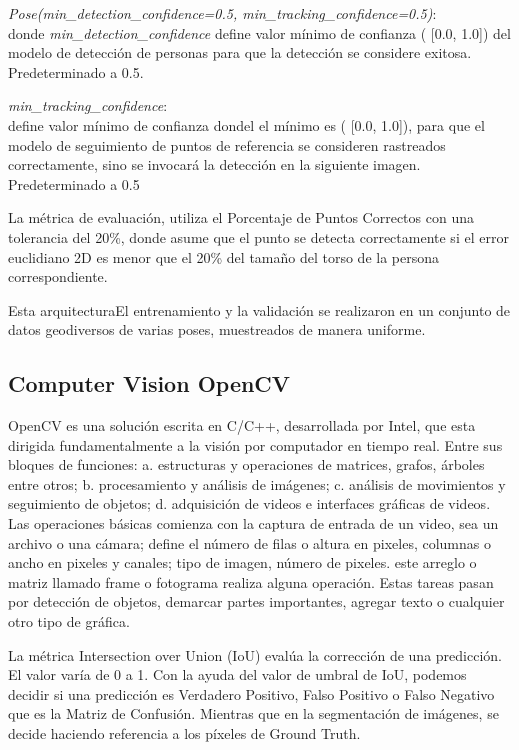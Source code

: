 \documentclass[twoside,11pt]{article}
\begin{document}
\textit{Pose(min\_detection\_confidence=0.5, min\_tracking\_confidence=0.5)}:\\
donde \textit{min\_detection\_confidence} define valor mínimo de 
confianza ( [0.0, 1.0]) del modelo de detección de personas para 
que la detección se considere exitosa. Predeterminado a 0.5. 

\textit{min\_tracking\_confidence}:\\ define valor mínimo de confianza 
 dondel el mínimo es ( [0.0, 1.0]), para que el modelo de seguimiento 
 de puntos de referencia se consideren rastreados correctamente, sino 
 se invocará la detección en la siguiente imagen. Predeterminado a 0.5

 La métrica de evaluación, utiliza el Porcentaje de Puntos Correctos con 
una tolerancia del 20\%, donde asume que el punto se detecta correctamente
 si el error euclidiano 2D es menor que el 20\% del tamaño del torso de 
 la persona correspondiente. 
 
 Esta arquitecturaEl entrenamiento y la validación se realizaron en un conjunto de datos 
 geodiversos de varias poses, muestreados de manera uniforme.

\subsection{Computer Vision OpenCV}
OpenCV es una solución escrita en C/C++, desarrollada por Intel, que esta dirigida 
fundamentalmente a la visión por computador en tiempo real. Entre sus bloques de 
funciones: a. estructuras y operaciones de matrices, grafos, árboles entre otros; 
b. procesamiento y análisis de imágenes; c. análisis de movimientos y seguimiento de objetos; 
d. adquisición de videos e interfaces gráficas de videos. Las operaciones básicas comienza 
con la captura de entrada de un video, sea un archivo o una cámara; define el número de filas 
o altura en pixeles, columnas o ancho en pixeles y canales; tipo de imagen, número de pixeles. 
este arreglo o matriz llamado frame o fotograma realiza alguna operación. Estas tareas pasan 
por detección de objetos, demarcar partes importantes, agregar texto o cualquier otro tipo de gráfica.

La métrica Intersection over Union (IoU) evalúa la corrección de una predicción. 
El valor varía de 0 a 1. Con la ayuda del valor de umbral de IoU, podemos decidir si 
una predicción es Verdadero Positivo, Falso Positivo o Falso Negativo que es la Matriz 
de Confusión. Mientras que en la segmentación de imágenes, se decide haciendo referencia 
a los píxeles de Ground Truth.
\end{document}
